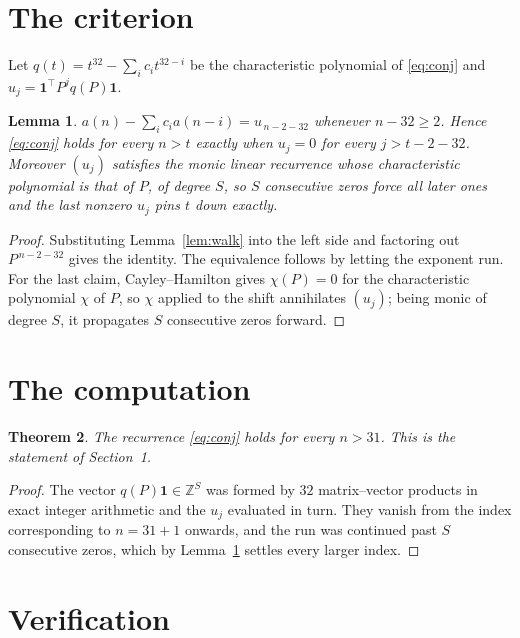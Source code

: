 \documentclass[11pt,a4paper]{article}
\theoremstyle{plain}
\newtheorem{theorem}{Theorem}
\newtheorem{lemma}[theorem]{Lemma}
\theoremstyle{definition}
\begin{document}
\section{The criterion}

Let $q(t)=t^{32}-\sum_i c_i t^{32-i}$ be the characteristic polynomial of
\eqref{eq:conj} and $u_j=\mathbf{1}^{\!\top}P^{j}q(P)\mathbf{1}$.

\begin{lemma}\label{lem:crit}
$a(n)-\sum_i c_i a(n-i)=u_{\,n-2-32}$ whenever $n-32\ge2$. Hence
\eqref{eq:conj} holds for every $n>t$ exactly when $u_j=0$ for every
$j>t-2-32$. Moreover $(u_j)$ satisfies the monic linear recurrence whose
characteristic polynomial is that of $P$, of degree $S$, so $S$ consecutive zeros force all
later ones and the last nonzero $u_j$ pins $t$ down exactly.
\end{lemma}

\begin{proof}
Substituting Lemma~\ref{lem:walk} into the left side and factoring out
$P^{\,n-2-32}$ gives the identity. The equivalence follows by letting the exponent
run. For the last claim, Cayley--Hamilton gives $\chi(P)=0$ for the characteristic
polynomial $\chi$ of $P$, so $\chi$ applied to the shift annihilates $(u_j)$; being monic of
degree $S$, it propagates $S$ consecutive zeros forward.
\end{proof}

\section{The computation}

\begin{theorem}
The recurrence \eqref{eq:conj} holds for every $n>31$. This is the statement of
Section~1.
\end{theorem}

\begin{proof}
The vector $q(P)\mathbf{1}\in\mathbb{Z}^{S}$ was formed by $32$ matrix--vector
products in exact integer arithmetic and the $u_j$ evaluated in turn. They vanish from the
index corresponding to $n=31+1$ onwards, and the run was continued past $S$ consecutive
zeros, which by Lemma~\ref{lem:crit} settles every larger index.
\end{proof}

\section{Verification}
\end{document}
